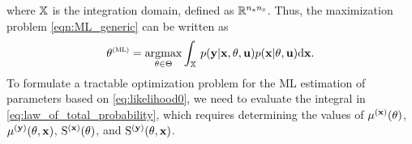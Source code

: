 where 
${\mathbb{X}}$ 
is the integration domain, defined as $\Rbb^{\Nx\nsD}$.
Thus, the maximization problem \eqref{eqn:ML_generic} can be written as 
\begin{equation}\label{eq:likelihood0}
\begin{split}
\vcthetaML 
= 
\argmaxOp_{\vctheta\in\Theta} 
\int_{\Xbb}\, p(\mathbf{y}|\mathbf{x}, \vctheta, \mathbf{u})p(\mathbf{x}|\vctheta, \mathbf{u}) \drm \mathbf{x}. \\
\end{split}
\end{equation}
To formulate a tractable optimization problem for the ML estimation of parameters based on \eqref{eq:likelihood0}, we need to evaluate the integral in \eqref{eq:law_of_total_probability}, which requires
determining the values of $\mu^{(\mathbf{x})}({ \mathrm{\theta} })$, $\mu^{(\mathbf{y})}({ \mathrm{\theta} },\mathbf{x})$, ${ \mathrm{S} }^{(\mathbf{x})}({ \mathrm{\theta} })$, and ${ \mathrm{S} }^{(\mathbf{y})}({ \mathrm{\theta} },\mathbf{x})$.
%
%
